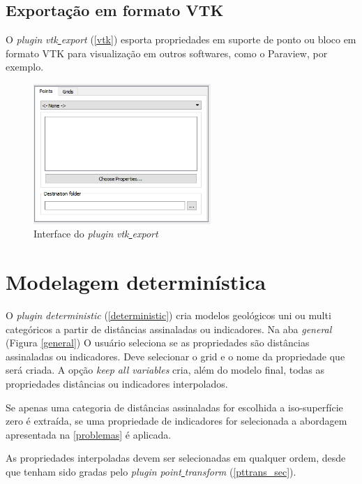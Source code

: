 \subsection{Exportação em formato VTK}

O \textit{plugin} \textit{vtk\underline{ }export} (\autoref{vtk}) esporta propriedades em suporte de ponto ou bloco em formato VTK para visualização em outros softwares, como o Paraview, por exemplo.

\begin{figure}[H]
	\caption{\label{vtk}Interface do \textit{plugin} \textit{vtk\underline{ }export}}
	\centering
		\includegraphics[width=0.6\textwidth]{apendice/imagens/vtk_export_1.PNG}
\end{figure}

\section{Modelagem determinística}

O \textit{plugin} \textit{deterministic} (\autoref{deterministic}) cria modelos geológicos uni ou multi categóricos a partir de distâncias assinaladas ou indicadores. Na aba \textit{general} (Figura \autoref{general}) O usuário seleciona se as propriedades são distâncias assinaladas ou indicadores. Deve selecionar o grid e o nome da propriedade que será criada. A opção \textit{keep all variables} cria, além do modelo final, todas as propriedades distâncias ou indicadores interpolados.

Se apenas uma categoria de distâncias assinaladas for escolhida a iso-superfície zero é extraída, se uma propriedade de indicadores for selecionada a abordagem apresentada na \autoref{problemas} é aplicada.
 
As propriedades interpoladas devem ser selecionadas em qualquer ordem, desde que tenham sido gradas pelo \textit{plugin} \textit{point\underline{ }transform} (\autoref{pttrans_sec}).

